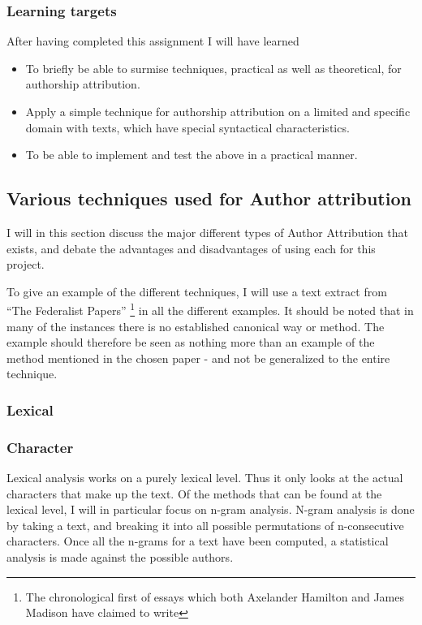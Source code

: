 \subsubsection{Learning targets}
After having completed this assignment I will have learned 
\begin{itemize}
\item To briefly be able to surmise techniques, practical as well as theoretical, for authorship attribution.
\item Apply a simple technique for authorship attribution on a limited and specific domain with texts, which have special syntactical characteristics.
\item To be able to implement and test the above in a practical manner.
\end{itemize}

\subsection{Various techniques used for Author attribution}

I will in this section discuss the major different types of Author Attribution that exists, and debate the advantages and disadvantages of using each for this project.

To give an example of the different techniques, I will use a text extract from ``The Federalist Papers'' \cite{federalist} \footnote{The chronological first of essays which both Axelander Hamilton and James Madison have claimed to write} in all the different examples. It should be noted that in many of the instances there is no established canonical way or method. The example should therefore be seen as nothing more than an example of the method mentioned in the chosen paper - and not be generalized to the entire technique.

\subsubsection{Lexical}

\subsubsection{Character}
Lexical analysis works on a purely lexical level. Thus it only looks at the actual characters that make up the text. Of the methods that can be found at the lexical level, I will in particular focus on n-gram analysis. N-gram analysis is done by taking a text, and breaking it into all possible permutations of n-consecutive characters. Once all the n-grams for a text have been computed, a statistical analysis is made against the possible authors.

